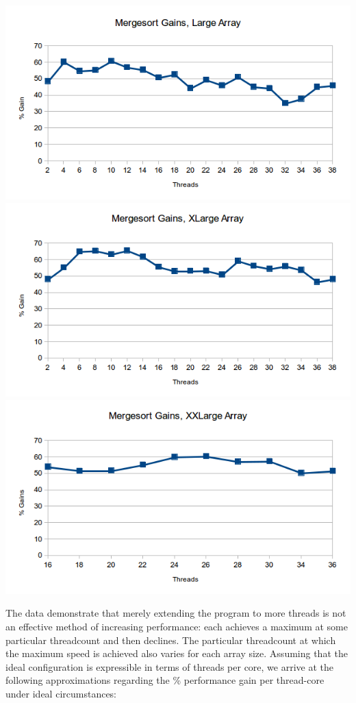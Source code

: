 \documentclass{article}
\begin{document}
\begin{center}
\includegraphics{gains-large.png}
\includegraphics{gains-xlarge-nolegend.png}
\includegraphics{gains-xxlarge-nolegend.png}
\end{center}

The data demonstrate that merely extending the program to more threads
is not an effective method of increasing performance: each achieves a
maximum at some particular threadcount and then declines. The
particular threadcount at which the maximum speed is achieved also
varies for each array size. Assuming that the ideal configuration is
expressible in terms of threads per core, we arrive at the following
approximations regarding the \% performance gain per thread-core
under ideal circumstances:
\end{document}
